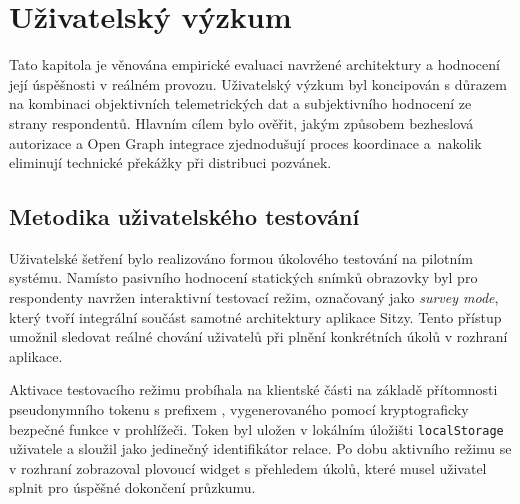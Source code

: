\documentclass[male,czech,api_bc]{kitheses}
\begin{document}
\chapter{Uživatelský výzkum}
\label{chap:uzivatelsky_vyzkum}

Tato kapitola je věnována empirické evaluaci navržené architektury a hodnocení její úspěšnosti v reálném provozu. Uživatelský výzkum byl koncipován s důrazem na kombinaci objektivních telemetrických dat a subjektivního hodnocení ze strany respondentů. Hlavním cílem bylo ověřit, jakým způsobem bezheslová autorizace a Open Graph integrace zjednodušují proces koordinace a~nakolik eliminují technické překážky při distribuci pozvánek.

\section{Metodika uživatelského testování}
\label{sec:metodika_testovani}

Uživatelské šetření bylo realizováno formou úkolového testování na pilotním systému. Namísto pasivního hodnocení statických snímků obrazovky byl pro respondenty navržen interaktivní testovací režim, označovaný jako \textit{survey mode}, který tvoří integrální součást samotné architektury aplikace Sitzy. Tento přístup umožnil sledovat reálné chování uživatelů při plnění konkrétních úkolů v rozhraní aplikace.

Aktivace testovacího režimu probíhala na klientské části na základě přítomnosti pseudonymního tokenu s prefixem , vygenerovaného pomocí kryptograficky bezpečné funkce  v prohlížeči. Token byl uložen v lokálním úložišti \texttt{localStorage} uživatele a sloužil jako jedinečný identifikátor relace. Po dobu aktivního režimu se v rozhraní zobrazoval plovoucí widget s přehledem úkolů, které musel uživatel splnit pro úspěšné dokončení průzkumu. 
\end{document}
